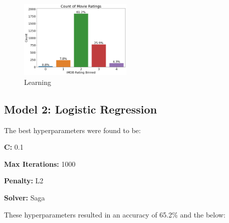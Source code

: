 \documentclass[11pt]{article}
\begin{document}
\begin{figure}[!ht]
	\centering
	\includegraphics[width = 0.48\textwidth]{res/class-dist.png}
	\caption{Learning }
	\label{fig:svm-lc-ft}
\end{figure}


\subsection{Model 2: Logistic Regression}
The best hyperparameters were found to be:

\textbf{C: } 0.1

\textbf{Max Iterations: } 1000

\textbf{Penalty: } L2

\textbf{Solver: } Saga

\noindent
These hyperparameters resulted in an accuracy of 65.2\% and the below:
\end{document}
